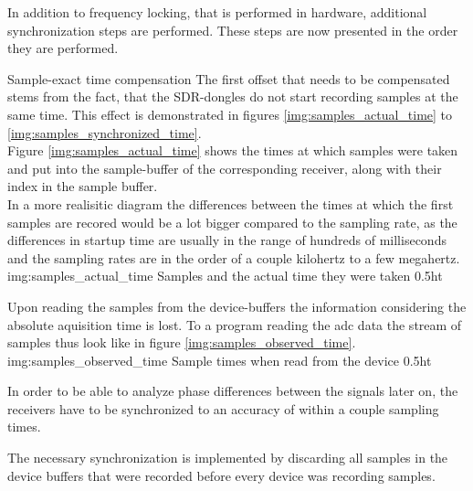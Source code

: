 In addition to frequency locking, that is performed in
hardware, additional synchronization steps are
performed. These steps are now presented in the
order they are performed. \\



\begin{subchapter}{Sample-exact time compensation}
  The first offset that needs to be compensated stems
  from the fact, that the SDR-dongles do not start
  recording samples at the same time.
  This effect is demonstrated in figures
  \ref{img:samples_actual_time} to \ref{img:samples_synchronized_time}. \\

  Figure \ref{img:samples_actual_time} shows the
  times at which samples were taken and put into the
  sample-buffer of the corresponding receiver, along
  with their index in the sample buffer.  \\

  In a more realisitic diagram the differences between the
  times at which the first samples are recored would be
  a lot bigger compared to the sampling rate, as the
  differences in startup time are usually in the range
  of hundreds of milliseconds and the sampling rates are
  in the order of a couple kilohertz to a few megahertz. \\

               {img:samples_actual_time}
               {Samples and the actual time they were taken}
               {0.5}{ht}

  Upon reading the samples from the device-buffers
  the information considering the absolute aquisition time is
  lost. To a program reading the \acrshort{adc} data the
  stream of samples thus look like in figure \ref{img:samples_observed_time}. \\

               {img:samples_observed_time}
               {Sample times when read from the device}
               {0.5}{ht}

  In order to be able to analyze phase differences between
  the signals later on, the receivers have to be synchronized to
  an accuracy of within a couple sampling times.

  The necessary synchronization is implemented by discarding
  all samples in the device buffers that were recorded
  before every device was recording samples.


\end{subchapter}
